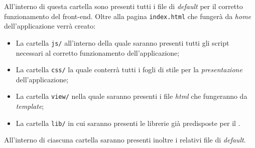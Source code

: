 All'interno di questa cartella sono presenti tutti i file di \textit{default} per il corretto funzionamento del front-end. Oltre alla pagina \texttt{index.html} che fungerà da \emph{home} dell'applicazione verrà creato:

\begin{itemize}

	\item La cartella \texttt{js/} all'interno della quale saranno presenti tutti gli script  necessari al corretto funzionamento dell'applicazione;
	\item La cartella \texttt{css/} la quale conterrà tutti i fogli di stile per la \textit{presentazione} dell'applicazione;
	\item La cartella \texttt{view/} nella quale saranno presenti i file \textit{html} che fungeranno da \textit{template};
	\item La cartella \texttt{lib/} in cui saranno presenti le librerie  già predisposte per il .

\end{itemize}

All'interno di ciascuna cartella saranno presenti inoltre i relativi file di \textit{default}.
